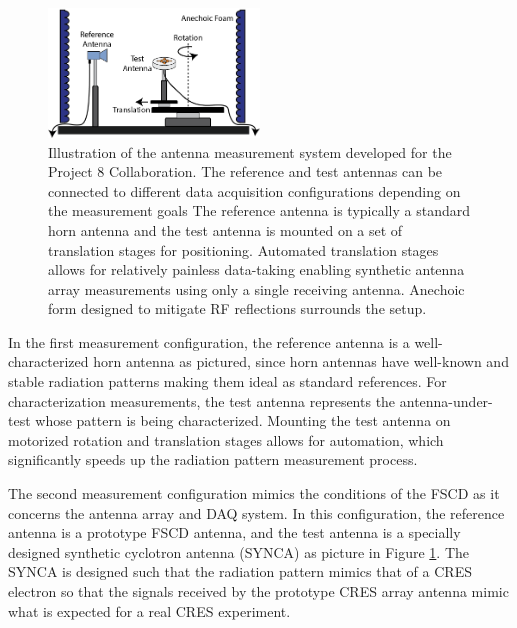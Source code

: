 \begin{figure}[htbp]
    \centering
    \includegraphics[width=0.5\textwidth]{figs/Chapter-5/230409_measurement_system_figure_cartoon.png}
    \caption{Illustration of the antenna measurement system developed for the Project 8 Collaboration. The reference and test antennas can be connected to different data acquisition configurations depending on the measurement goals The reference antenna is typically a standard horn antenna and the test antenna is mounted on a set of translation stages for positioning. Automated translation stages allows for relatively painless data-taking enabling synthetic antenna array measurements using only a single receiving antenna. Anechoic form designed to mitigate RF reflections surrounds the setup.}
    \label{fig:meas-sys-cartoon}
\end{figure}

In the first measurement configuration, the reference antenna is a well-characterized horn antenna as pictured, since horn antennas have well-known and stable radiation patterns making them ideal as standard references. For characterization measurements, the test antenna represents the antenna-under-test whose pattern is being characterized. Mounting the test antenna on motorized rotation and translation stages allows for automation, which significantly speeds up the radiation pattern measurement process. 

The second measurement configuration mimics the conditions of the FSCD as it concerns the antenna array and DAQ system. In this configuration, the reference antenna is a prototype FSCD antenna, and the test antenna is a specially designed synthetic cyclotron antenna (SYNCA) as picture in Figure \ref{fig:meas-sys-cartoon}. The SYNCA is designed such that the radiation pattern mimics that of a CRES electron so that the signals received by the prototype CRES array antenna mimic what is expected for a real CRES experiment. 


